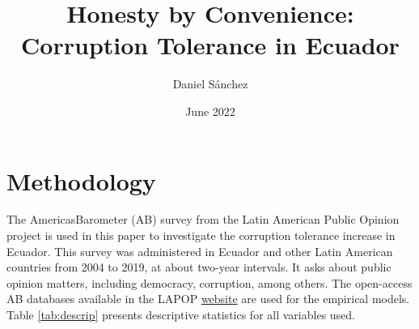 \documentclass[12pt,a4]{article}
\title{Honesty by Convenience: Corruption Tolerance in Ecuador}
\author{Daniel Sánchez}
\date{June 2022}
\begin{document}


\section{Methodology}
\label{sec:methodology} %

The AmericasBarometer (AB) survey from the Latin American Public Opinion project is used in this paper to investigate the corruption tolerance increase in Ecuador. This survey was administered in Ecuador and other Latin American countries from 2004 to 2019, at about two-year intervals. It asks about public opinion matters, including democracy, corruption, among others. The open-access AB databases available in the LAPOP \href{https://www.vanderbilt.edu/lapop/data-access.php}{website} are used for the empirical models. Table \ref{tab:descrip} presents descriptive statistics for all variables used.
\end{document}

